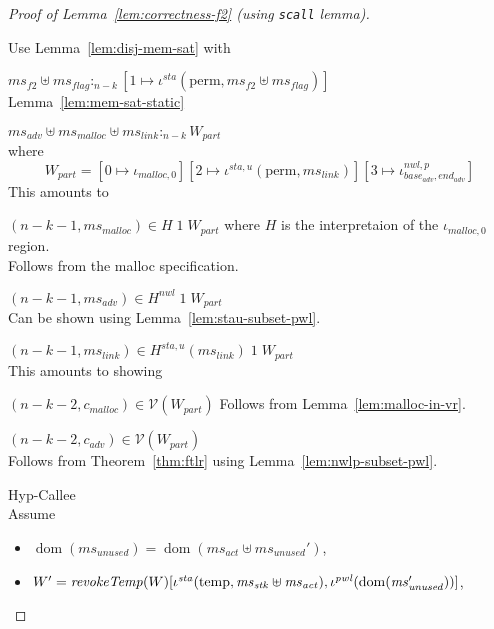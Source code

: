 \documentclass[a4paper]{article}
\DeclareMathOperator{\dom}{dom}
\newcommand{\var}[1]{\mathit{#1}}
\newcommand{\hs}{\var{ms}}
\newcommand{\ms}{\hs}
\newcommand{\start}{\var{base}}
\newcommand{\addrend}{\var{end}}
\newcommand{\heap}{\var{mem}}
\newcommand{\adv}{\var{adv}}
\newcommand{\link}{\var{link}}
\newcommand{\stk}{\var{stk}}
\newcommand{\flag}{\var{flag}}
\newcommand{\nwl}{\var{nwl}}
\newcommand{\pwl}{\var{pwl}}
\newcommand{\sta}{\var{sta}}
\newcommand{\plainfun}[2]{
  \ifthenelse{\equal{#2}{}}
  {\mathit{#1}}
  {\mathit{#1}(#2)}
}
\newcommand{\revokeTemp}[1]{\plainfun{revokeTemp}{#1}}
\newcommand{\heapSat}[3][\heap]{#1 :_{#2} #3}
\newcommand{\memSat}[3][n]{\heapSat[#2]{#1}{#3}}
\newcommand{\codelabel}[1]{\mathit{#1}}
\newcommand{\malloc}{\codelabel{malloc}}
\newcommand{\asmType}{\plaindom{AsmType}}
\newcommand{\plaindom}[1]{\mathrm{#1}}
\newcommand{\intr}[2]{\mathcal{#1}}
\newcommand{\valueintr}[1]{\intr{V}{#1}}
\newcommand{\stdvr}{\valueintr{\asmType}}
\newcommand{\npair}[2][n]{\left(#1,#2 \right)}
\newcommand{\plainview}[1]{\mathrm{#1}}
\newcommand{\perma}{\plainview{perm}}
\newcommand{\temp}{\plainview{temp}}
\begin{document}
\begin{proof}[Proof of Lemma~\ref{lem:correctness-f2} (using \texttt{scall} lemma)]
\begin{enumproof}
    Use Lemma~\ref{lem:disj-mem-sat} with
    \begin{enumproof}
    \item $\memSat[n-k]{\ms_{f2} \uplus \ms_\flag}{[1 \mapsto \iota^\sta (\perma, \ms_{f2} \uplus \ms_\flag)]}$\\
      Lemma~\ref{lem:mem-sat-static}
      \item $\memSat[n-k]{\ms_\adv \uplus \ms_\malloc \uplus \ms_\link}{W_{\var{part}}}$ \\
        where
        \[
          W_{\var{part}} = [0 \mapsto \iota_{\malloc,0}][2 \mapsto \iota^{\sta,u} (\perma, \ms_\link)][3 \mapsto \iota^{\nwl,p}_{\start_\adv,\addrend_\adv}]
        \]
        This amounts to
        \begin{enumproof}
        \item $\npair[n-k-1]{\ms_\malloc} \in H \; 1 \; W_{\var{part}}$ where $H$ is the interpretaion of the $\iota_{\malloc,0}$ region.\\
          Follows from the malloc specification.
        \item $\npair[n-k-1]{\ms_\adv} \in H^\nwl \; 1 \; W_{\var{part}}$\\
          Can be shown using Lemma~\ref{lem:stau-subset-pwl}.
        \item $\npair[n-k-1]{\ms_\link} \in H^{\sta,u} (\ms_\link) \; 1 \; W_{\var{part}}$\\
          This amounts to showing
          \begin{enumproof}
            \item $\npair[n-k-2]{c_\malloc} \in \stdvr(W_{\var{part}})$
              Follows from Lemma~\ref{lem:malloc-in-vr}.
            \item $\npair[n-k-2]{c_\adv} \in \stdvr(W_{\var{part}})$\\
              Follows from Theorem~\ref{thm:ftlr} using Lemma~\ref{lem:nwlp-subset-pwl}.
          \end{enumproof}
        \end{enumproof}
    \end{enumproof}
  \item Hyp-Callee\\
    Assume
    \begin{itemize}
    \item $\dom(\ms_{\mathit{unused}}) = \dom(\ms_{\mathit{act}} \uplus \ms_{\mathit{unused}}')$,
    \item $W' = \revokeTemp{W}[\iota^{\sta}(\temp,\ms_\stk\uplus\ms_{\mathit{act}}),\iota^{\pwl}(\dom(\ms_{\mathit{unused}}'))]$,

\end{itemize}
\end{enumproof}
\end{proof}
\end{document}
